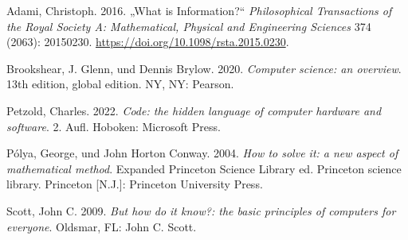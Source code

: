 \documentclass[
  letterpaper,
  DIV=11]{scrreprt}
\newlength{\cslhangindent}
\newenvironment{CSLReferences}[2] %
 {\begin{list}{}{%
  \setlength{\itemindent}{0pt}
  \setlength{\leftmargin}{0pt}
  \setlength{\parsep}{0pt}
  \ifodd #1
   \setlength{\leftmargin}{\cslhangindent}
   \setlength{\itemindent}{-1\cslhangindent}
  \fi
  \setlength{\itemsep}{#2\baselineskip}}}
 {\end{list}}
\begin{document}
\label{refs}
\begin{CSLReferences}{1}{0}
Adami, Christoph. 2016. {„What is {Information}?``} \emph{Philosophical
Transactions of the Royal Society A: Mathematical, Physical and
Engineering Sciences} 374 (2063): 20150230.
\url{https://doi.org/10.1098/rsta.2015.0230}.

Brookshear, J. Glenn, und Dennis Brylow. 2020. \emph{Computer science:
an overview}. 13th edition, global edition. NY, NY: Pearson.

Petzold, Charles. 2022. \emph{Code: the hidden language of computer
hardware and software}. 2. Aufl. Hoboken: Microsoft Press.

Pólya, George, und John Horton Conway. 2004. \emph{How to solve it: a
new aspect of mathematical method}. Expanded Princeton Science Library
ed. Princeton science library. Princeton {[}N.J.{]}: Princeton
University Press.

Scott, John C. 2009. \emph{But how do it know?: the basic principles of
computers for everyone}. Oldsmar, FL: John C. Scott.

\end{CSLReferences}



\printindex
\end{document}
